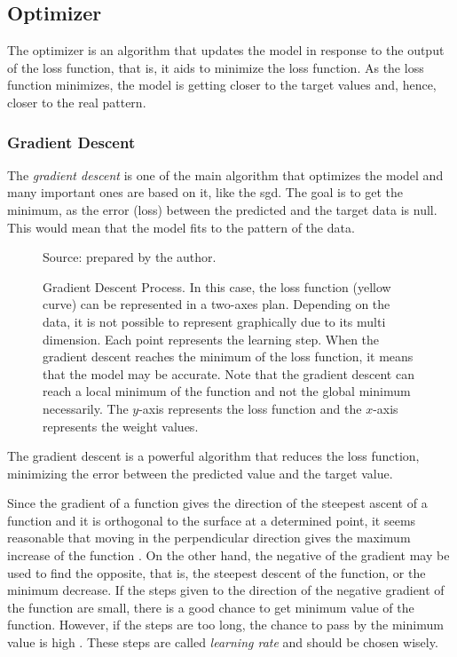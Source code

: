 \subsection{Optimizer}\label{sec:optimizer}

The optimizer is an algorithm that updates the model in response to the output of the loss function, that is, it aids to minimize the loss function. 
As the loss function minimizes, the model is getting closer to the target values and, hence, closer to the real pattern.

\subsubsection*{Gradient Descent} 

The \emph{gradient descent} is one of the main algorithm \citep{nesterov2004} that optimizes the model and many important ones are based on it, like the \gls*{sgd}. The goal is to get the minimum, as the error (loss) between the predicted and the target data is null. This would mean that the model fits to the pattern of the data.
%
\begin{figure}[!htb]
    \centering
    \caption[Gradient Descent Process]{Gradient Descent Process. In this case, the loss function (yellow curve) can be represented in a two-axes plan. Depending on the data, it is not possible to represent graphically due to its multi dimension. Each point represents the learning step. When the gradient descent reaches the minimum of the loss function, it means that the model may be accurate. Note that the gradient descent can reach a local minimum of the function and not the global minimum necessarily. The \(y\)-axis represents the loss function and the \(x\)-axis represents the weight values.}
    
    \begin{flushleft}\footnotesize
        Source: prepared by the author.
    \end{flushleft}
    
\end{figure}

The gradient descent is a powerful algorithm that reduces the loss function, minimizing the error between the predicted value and the target value.

Since the gradient of a function gives the direction of the steepest ascent of a function and it is orthogonal to the surface at a determined point, it seems reasonable that moving in the perpendicular direction gives the maximum increase of the function \citep{stewart2016}.
On the other hand, the negative of the gradient may be used to find the opposite, that is, the steepest descent of the function, or the minimum decrease.
If the steps given to the direction of the negative gradient of the function are small, there is a good chance to get minimum value of the function.
However, if the steps are too long, the chance to pass by the minimum value is high \citep{nielsen2015}.
These steps are called \emph{learning rate} and should be chosen wisely.


